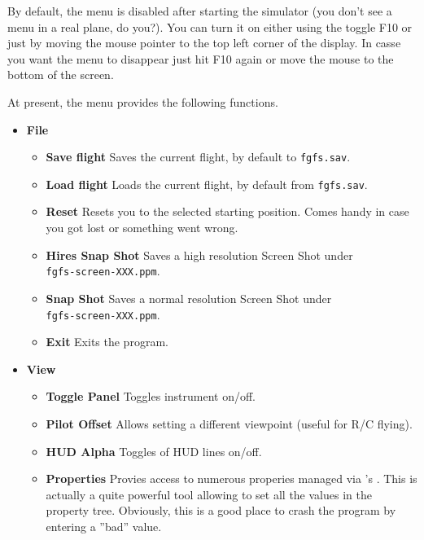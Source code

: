 By default, the menu is disabled after starting the simulator (you don't see a menu in a real plane, do you?). You can turn it on either using the toggle F10 or just by moving the mouse pointer to the top left corner of the display. In casse you want the menu to disappear just hit F10 again or move the mouse to the bottom of the screen.

At present, the menu provides the following functions.

\begin{itemize}
 \item \textbf{File}
 \begin{itemize}
 \item \textbf{Save flight} Saves the current flight, by default to \texttt{fgfs.sav}.
 \item \textbf{Load flight} Loads the current flight, by default from \texttt{fgfs.sav}.
 \item \textbf{Reset} Resets you to the selected starting position. Comes handy in case you got
lost or something went wrong.
\item \textbf{Hires Snap Shot} Saves a high resolution Screen Shot under\\ \texttt{fgfs-screen-XXX.ppm}.
  \item \textbf{Snap Shot} Saves a normal resolution Screen Shot under\\ \texttt{fgfs-screen-XXX.ppm}.
  \item \textbf{Exit} Exits the program.
 \end{itemize}

 \item \textbf{View}
 \begin{itemize}
 \item \textbf{Toggle Panel} Toggles instrument  on/off.
 \item \textbf{Pilot Offset} Allows setting a different viewpoint (useful for R/C flying).
 \item \textbf{HUD Alpha} Toggles  of HUD lines on/off.
 \item \textbf{Properties} Provies access to numerous properies managed via \FlightGear{}'s . This is actually a quite powerful tool allowing to set all the values in the property tree. Obviously, this is a good place to crash the program by entering a ''bad'' value.
 \end{itemize}
 

\end{itemize}
